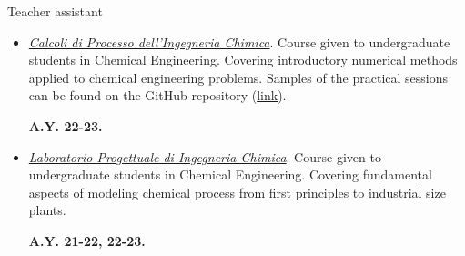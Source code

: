 \begin{position_simple}{Teacher assistant}{\polimi}
\begin{itemize}

   \item[ ]
      \begin{minipage}[t]{0.75\textwidth}
        \ul{\it Calcoli di Processo dell'Ingegneria Chimica}. Course given to
        undergraduate students in Chemical Engineering. Covering introductory numerical
        methods applied to chemical engineering problems. Samples of the practical sessions
        can be found on the GitHub repository
        (\href{https://github.com/Titodinelli/Calcoli-di-Processo-dell-Ingegneria-Chimica}{link}).
      \end{minipage}
      \begin{minipage}[t]{0.18\textwidth}
         \begin{flushright}
            \bfseries A.Y. 22-23.
         \end{flushright}
      \end{minipage}

   \item[ ]
      \begin{minipage}[t]{0.75\textwidth}
      \ul{\it Laboratorio Progettuale di Ingegneria Chimica}. Course given to
      undergraduate students in Chemical Engineering. Covering fundamental aspects of
      modeling chemical process from first principles to industrial size plants.
      \end{minipage}
      \begin{minipage}[t]{0.18\textwidth}
         \begin{flushright}
            \bfseries A.Y. 21-22, 22-23.
         \end{flushright}
      \end{minipage}
\end{itemize}
\end{position_simple}

